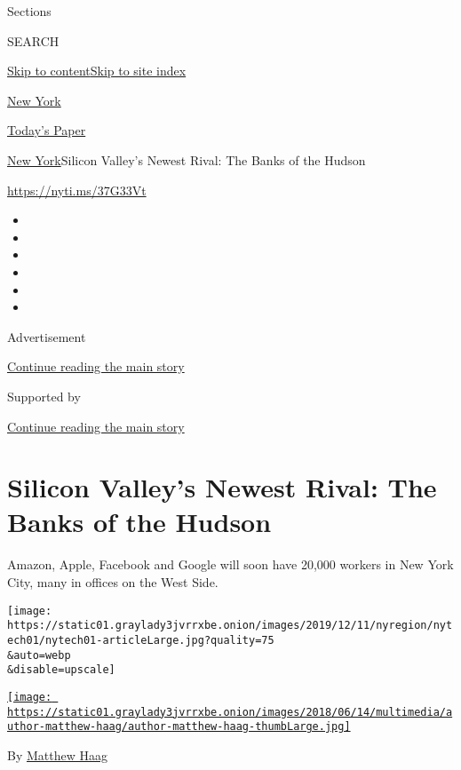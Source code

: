 Sections

SEARCH

\protect\hyperlink{site-content}{Skip to
content}\protect\hyperlink{site-index}{Skip to site index}

\href{https://www.nytimes3xbfgragh.onion/section/nyregion}{New York}

\href{https://myaccount.nytimes3xbfgragh.onion/auth/login?response_type=cookie\&client_id=vi}{}

\href{https://www.nytimes3xbfgragh.onion/section/todayspaper}{Today's
Paper}

\href{/section/nyregion}{New York}\textbar{}Silicon Valley's Newest
Rival: The Banks of the Hudson

\url{https://nyti.ms/37G33Vt}

\begin{itemize}
\item
\item
\item
\item
\item
\item
\end{itemize}

Advertisement

\protect\hyperlink{after-top}{Continue reading the main story}

Supported by

\protect\hyperlink{after-sponsor}{Continue reading the main story}

\hypertarget{silicon-valleys-newest-rival-the-banks-of-the-hudson}{%
\section{Silicon Valley's Newest Rival: The Banks of the
Hudson}\label{silicon-valleys-newest-rival-the-banks-of-the-hudson}}

Amazon, Apple, Facebook and Google will soon have 20,000 workers in New
York City, many in offices on the West Side.

\texttt{[image: https://static01.graylady3jvrrxbe.onion/images/2019/12/11/nyregion/nytech01/nytech01-articleLarge.jpg?quality=75\\\&auto=webp\\\&disable=upscale]}

\href{https://www.nytimes3xbfgragh.onion/by/matthew-haag}{\texttt{[image: https://static01.graylady3jvrrxbe.onion/images/2018/06/14/multimedia/author-matthew-haag/author-matthew-haag-thumbLarge.jpg]}}

By \href{https://www.nytimes3xbfgragh.onion/by/matthew-haag}{Matthew
Haag}

